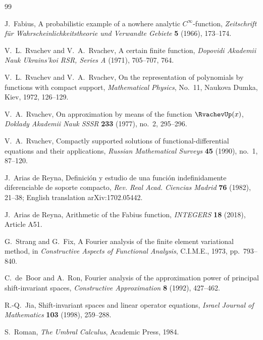 \documentclass[11pt]{article}
\theoremstyle{definition}
\theoremstyle{remark}
\begin{document}
\begin{thebibliography}{99}

J.~Fabius,
\newblock A probabilistic example of a nowhere analytic $C^\infty$-function,
\newblock \emph{Zeitschrift f\"ur Wahrscheinlichkeitstheorie und Verwandte
Gebiete} \textbf{5} (1966), 173--174.

V.~L.~Rvachev and V.~A.~Rvachev,
\newblock A certain finite function,
\newblock \emph{Dopovidi Akademii Nauk Ukrains'koi RSR, Series A} (1971),
705--707, 764.

V.~L.~Rvachev and V.~A.~Rvachev,
\newblock On the representation of polynomials by functions with compact
support,
\newblock \emph{Mathematical Physics}, No.~11, Naukova Dumka, Kiev, 1972,
126--129.

V.~A.~Rvachev,
\newblock On approximation by means of the function $\RvachevUp(x)$,
\newblock \emph{Doklady Akademii Nauk SSSR} \textbf{233} (1977), no.~2,
295--296.

V.~A.~Rvachev,
\newblock Compactly supported solutions of functional-differential equations
and their applications,
\newblock \emph{Russian Mathematical Surveys} \textbf{45} (1990), no.~1,
87--120.

J.~Arias de Reyna,
\newblock Definici\'on y estudio de una funci\'on indefinidamente diferenciable
de soporte compacto,
\newblock \emph{Rev. Real Acad. Ciencias Madrid} \textbf{76} (1982), 21--38;
English translation arXiv:1702.05442.

J.~Arias de Reyna,
\newblock Arithmetic of the Fabius function,
\newblock \emph{INTEGERS} \textbf{18} (2018), Article A51.

G.~Strang and G.~Fix,
\newblock A Fourier analysis of the finite element variational method,
\newblock in \emph{Constructive Aspects of Functional Analysis}, C.I.M.E.,
1973, pp.~793--840.

C.~de~Boor and A.~Ron,
\newblock Fourier analysis of the approximation power of principal
shift-invariant spaces,
\newblock \emph{Constructive Approximation} \textbf{8} (1992), 427--462.

R.-Q.~Jia,
\newblock Shift-invariant spaces and linear operator equations,
\newblock \emph{Israel Journal of Mathematics} \textbf{103} (1998), 259--288.

S.~Roman,
\newblock \emph{The Umbral Calculus},
\newblock Academic Press, 1984.


\end{thebibliography}
\end{document}
